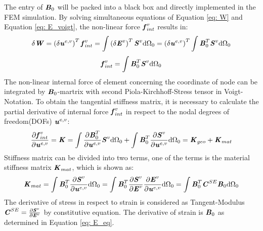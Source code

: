 The entry of $\textbf{\textit{B}}_0$ will be packed into a black box and directly implemented in the FEM simulation. By solving simultaneous equations of Equation \ref{eq: W} and Equation \ref{eq: E_voigt}, the non-linear force $\textbf{\textit{f}}_{int}^v$ results in:
\begin{equation}
\delta \textbf{\textit{W}} = \left(\delta \textbf{\textit{u}}^{e,v}\right)^T \textbf{\textit{f}}_{int}^v = \int \left(\delta \textbf{\textit{E}}^v\right)^T \textbf{\textit{S}}^v \mathrm{d}\Omega_0 = \left( \delta \textbf{\textit{u}}^{e,v}\right)^T \int \textbf{\textit{B}}_0^T \textbf{\textit{S}}^v \mathrm{d}\Omega_0
\end{equation}
\begin{equation}
\textbf{\textit{f}}_{int}^v = \int \textbf{\textit{B}}_0^T \textbf{\textit{S}}^v \mathrm{d}\Omega_0
\end{equation}
The non-linear internal force of element concerning the coordinate of node can be integrated by $\textbf{\textit{B}}_0$-martrix with second Piola-Kirchhoff-Stress tensor in Voigt-Notation. To obtain the tangential stiffness matrix, it is necessary to calculate the partial derivative of internal force $\textbf{\textit{f}}_{int}^v$ in respect to the nodal degrees of freedom(DOFs) $\textbf{\textit{u}}^{e,v}$:
\begin{equation} \label{K}
\frac{\partial \textbf{\textit{f}}_{int}^v}{\partial \textbf{\textit{u}}^{e,v}} = \textbf{\textit{K}} = \int \frac{\partial \textbf{\textit{B}}_0^T}{\partial \textbf{\textit{u}}^{e,v}} \textbf{\textit{S}}^v \mathrm{d}\Omega_0 + \int \textbf{\textit{B}}_0^T \frac{\partial \textbf{\textit{S}}^v}{\partial \textbf{\textit{u}}^{e,v}} \mathrm{d}\Omega_0 = \textbf{\textit{K}}_{geo} + \textbf{\textit{K}}_{mat}
\end{equation}
Stiffness matrix can be divided into two terms, one of the terms is the material stiffness matrix $\textbf{\textit{K}}_{mat}$, which is shown as:
\begin{equation}
\textbf{\textit{K}}_{mat} = \int \textbf{\textit{B}}_0^T \frac{\partial \textbf{\textit{S}}^v}{\partial \textbf{\textit{u}}^{e,v}}\mathrm{d}\Omega_0 = \int \textbf{\textit{B}}_0^T\frac{\partial \textbf{\textit{S}}^v}{\partial \textbf{\textit{E}}^v} \frac{\partial \textbf{\textit{E}}^v}{\partial \textbf{\textit{u}}^{e,v}} \mathrm{d}\Omega_0 = \int \textbf{\textit{B}}_0^T \textbf{\textit{C}}^{SE} \textbf{\textit{B}}_0 \mathrm{d}\Omega_0
\end{equation}
The derivative of stress in respect to strain is considered as Tangent-Modulus $\textbf{\textit{C}}^{SE} = \frac{\partial \textbf{\textit{S}}^v}{\partial \textbf{\textit{E}}^v}$ by constitutive equation. The derivative of strain is $\textbf{\textit{B}}_0$ as determined in Equation \ref{eq: E_eq}. \\

